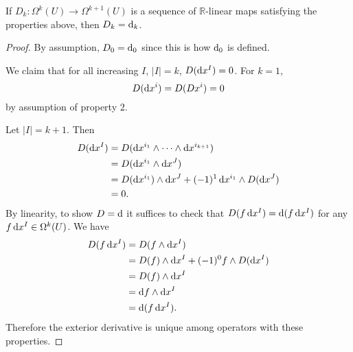\begin{prop}
If $D_k: \Omega^k(U) \to \Omega^{k+1}(U)$ is a sequence of
$\mathbb{R}$-linear maps satisfying the properties above, then
$D_k = \mathop{}\!\mathrm{d}_k$.
\end{prop}
\begin{proof}
By assumption, $D_0 = \mathop{}\!\mathrm{d}_0$ since this is how $\mathop{}\!\mathrm{d}_0$ is defined.

We claim that for all increasing $I$, $|I| = k$,
$D(\mathop{}\!\mathrm{d} x^I) = 0$. For $k = 1$,
$$
D(\mathop{}\!\mathrm{d} x^i) = D(D x^i) = 0
$$
by assumption of property 2.

Let $|I| = k + 1$. Then
\begin{align*}
   D(\dif x^I)
&= D(\dif x^{i_1} \wedge \cdots \wedge \dif x^{i_{k+1}}) \\
&= D(\dif x^{i_1} \wedge \dif x^J) \\
&= D(\dif x^{i_1}) \wedge \dif x^J
 + (-1)^1 \dif x^{i_1} \wedge D(\dif x^J) \\
&= 0.
\end{align*}
By linearity, to show $D = \mathop{}\!\mathrm{d}$ it suffices to check that
$D(f \mathop{}\!\mathrm{d} x^I) = \mathop{}\!\mathrm{d} (f \mathop{}\!\mathrm{d} x^I)$ for any
$f \mathop{}\!\mathrm{d} x^I \in \Omega^k(U)$.
We have
\begin{align*}
   D(f \dif x^I)
&= D(f \wedge \dif x^I) \\
&= D(f) \wedge \dif x^I + (-1)^0 f \wedge D(\dif x^I) \\
&= D(f) \wedge \dif x^I \\
&= \dif f \wedge \dif x^I \\
&= \dif(f \dif x^I).
\end{align*}
Therefore the exterior derivative is unique among operators with these
properties.
\end{proof}

